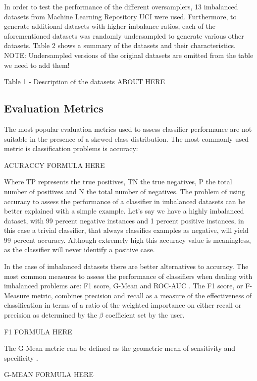 \documentclass[parskip=full]{scrartcl}
\begin{document}
In order to test the performance of the different oversamplers, 13 imbalanced 
datasets from Machine Learning Repository UCI were used. Furthermore, to 
generate additional datasets with higher imbalance ratios, each of the 
aforementioned datasets was randomly undersampled to generate various other 
datasets. Table 2 shows a summary of the datasets and their characteristics.
NOTE: Undersampled versions of the original datasets are omitted from the table 
we need to add them!

Table 1 - Description of the datasets ABOUT HERE

\subsection{Evaluation Metrics}

The most popular evaluation metrics used to assess classifier performance are 
not suitable in the presence of a skewed class distribution. The most commonly 
used metric is classification problems is accuracy:

ACURACCY FORMULA HERE

Where TP represents the true positives, TN the true negatives, P the total 
number of positives and N the total number of negatives. The problem of using 
accuracy to assess the performance of a classifier in imbalanced datasets can 
be better explained with a simple example. Let’s say we have a highly 
imbalanced dataset, with 99 percent negative instances and 1 percent positive 
instances, in this case a trivial classifier, that always classifies examples 
as negative, will yield 99 percent accuracy. Although extremely high this 
accuracy value is meaningless, as the classifier will never identify a positive 
case.

In the case of imbalanced datasets there are better alternatives to accuracy. 
The most common measures to assess the performance of classifiers when dealing 
with imbalanced problems are: F1 score, G-Mean and ROC-AUC \cite{He2009}. The 
F1 score, or F-Measure metric, combines precision and recall as a measure of 
the effectiveness of classification in terms of a ratio of the weighted 
importance on either recall or precision as determined by the $\beta$ coefficient set by the user.

F1 FORMULA HERE

The G-Mean metric can be defined as the geometric mean of sensitivity and 
specificity \cite{He2009}.

G-MEAN FORMULA HERE
\end{document}
